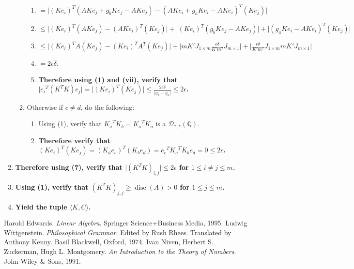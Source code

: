 \documentclass[twocolumn]{article}
\DeclareMathOperator{\disc}{disc}
\begin{document}
\begin{enumerate}
\begin{enumerate}
\begin{enumerate}
							\item $=\lvert(Ke_i)^T(AKe_j+g_bKe_j-AKe_j)-(AKe_i+g_aKe_i-AKe_i)^T(Ke_j)\rvert$
							\item $\le\lvert(Ke_i)^T(AKe_j)-(AKe_i)^T(Ke_j)\rvert+\lvert(Ke_i)^T(g_bKe_j-AKe_j)\rvert+\lvert(g_aKe_i-AKe_i)^T(Ke_j)\rvert$
							\item $\le\lvert(Ke_i)^TA(Ke_j)-(Ke_i)^TA^T(Ke_j)\rvert+\lvert mK'J_{1\times m}\frac{\epsilon\delta}{K'm^2}J_{m\times 1}\rvert+\lvert\frac{\epsilon\delta}{K'm^2}J_{1\times m}mK'J_{m\times 1}\rvert$
							\item $=2\epsilon\delta$.
							\item \textbf{Therefore using (1) and (vii), verify that $\lvert {e_i}^T(K^TK)e_j\rvert=\lvert(Ke_i)^T(Ke_j)\rvert\le\frac{2\epsilon\delta}{\lvert g_b-g_a\rvert}\le 2\epsilon$.}
						\end{enumerate}
						\item Otherwise if $c\ne d$, do the following:
						\begin{enumerate}
							\item Using (1), verify that ${K_a}^TK_b={K_a}^TK_a$ is a $\mathcal{D}_{*,*}(\mathbb{Q})$.
							\item \textbf{Therefore verify that $(Ke_i)^T(Ke_j)=(K_ae_c)^T(K_be_d)={e_c}^T{K_a}^TK_be_d=0\le 2\epsilon$.}
						\end{enumerate}
					\end{enumerate}
					\item \textbf{Therefore using (7), verify that $\lvert(K^TK)_{i,j}\rvert\le 2\epsilon$ for $1\le i\ne j\le m$.}
					\item \textbf{Using (1), verify that $(K^TK)_{j,j}\ge\disc(A)>0$ for $1\le j\le m$.}
					\item \textbf{Yield the tuple $\langle K,C\rangle$.}
				\end{enumerate}
	\begin{thebibliography}{9}
			Harold Edwards.
			\textit{Linear Algebra}. 
			Springer Science+Business Media, 1995.
			Ludwig Wittgenstein.
			\textit{Philosophical Grammar}.
			Edited by Rush Rhees.
			Translated by Anthony Kenny.
			Basil Blackwell, Oxford, 1974.
			Ivan Niven, Herbert S. Zuckerman, Hugh L. Montgomery.
			\textit{An Introduction to the Theory of Numbers}.
			John Wiley \& Sons, 1991.
	\end{thebibliography}
\end{document}
